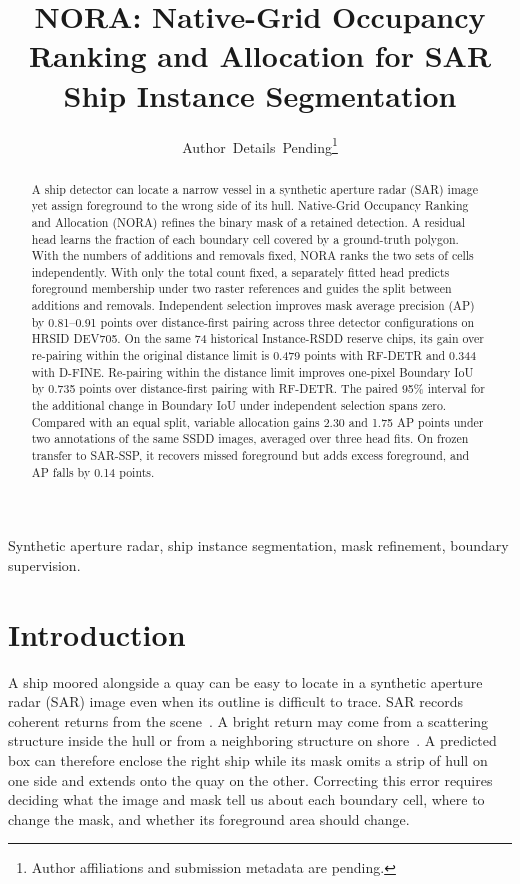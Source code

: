 \documentclass[journal]{IEEEtran}
\begin{document}
\raggedbottom
\title{NORA: Native-Grid Occupancy Ranking and Allocation for SAR Ship Instance Segmentation}
\author{Author~Details~Pending\thanks{Author affiliations and submission metadata are pending.}}
\maketitle

\begin{abstract}
A ship detector can locate a narrow vessel in a synthetic aperture radar (SAR) image yet assign foreground to the wrong side of its hull. Native-Grid Occupancy Ranking and Allocation (NORA) refines the binary mask of a retained detection. A residual head learns the fraction of each boundary cell covered by a ground-truth polygon. With the numbers of additions and removals fixed, NORA ranks the two sets of cells independently. With only the total count fixed, a separately fitted head predicts foreground membership under two raster references and guides the split between additions and removals. Independent selection improves mask average precision (AP) by 0.81--0.91 points over distance-first pairing across three detector configurations on HRSID DEV705. On the same 74 historical Instance-RSDD reserve chips, its gain over re-pairing within the original distance limit is 0.479 points with RF-DETR and 0.344 with D-FINE. Re-pairing within the distance limit improves one-pixel Boundary IoU by 0.735 points over distance-first pairing with RF-DETR. The paired 95\% interval for the additional change in Boundary IoU under independent selection spans zero. Compared with an equal split, variable allocation gains 2.30 and 1.75 AP points under two annotations of the same SSDD images, averaged over three head fits. On frozen transfer to SAR-SSP, it recovers missed foreground but adds excess foreground, and AP falls by 0.14 points.
\end{abstract}
\begin{IEEEkeywords}
Synthetic aperture radar, ship instance segmentation, mask refinement, boundary supervision.
\end{IEEEkeywords}

\section{Introduction}
\label{sec:introduction}

A ship moored alongside a quay can be easy to locate in a synthetic aperture radar (SAR) image even when its outline is difficult to trace. SAR records coherent returns from the scene~\cite{moreira2013}. A bright return may come from a scattering structure inside the hull or from a neighboring structure on shore~\cite{gao2024,gldet}. A predicted box can therefore enclose the right ship while its mask omits a strip of hull on one side and extends onto the quay on the other. Correcting this error requires deciding what the image and mask tell us about each boundary cell, where to change the mask, and whether its foreground area should change.
\end{document}
